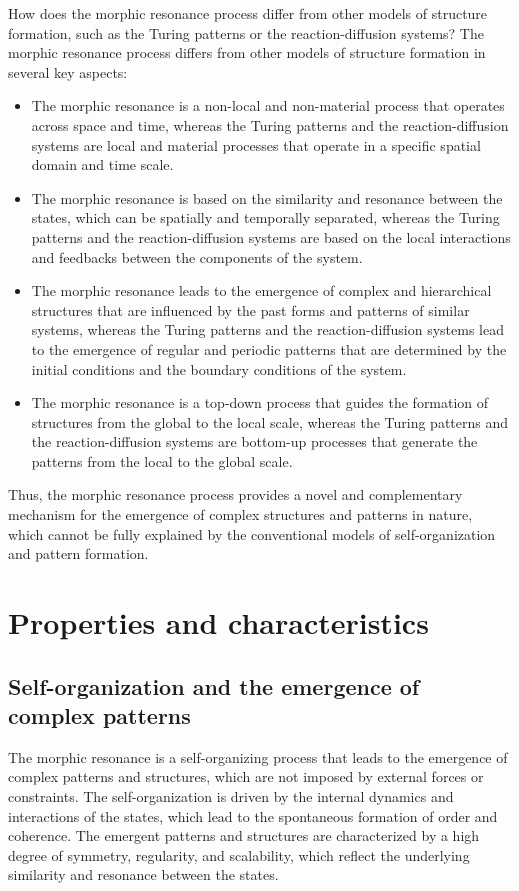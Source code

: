\begin{tcolorbox}[colback=green!5!white,colframe=green!75!black,title=Question]
    How does the morphic resonance process differ from other models of structure formation, such as the Turing patterns or the reaction-diffusion systems?
    \tcblower
    The morphic resonance process differs from other models of structure formation in several key aspects:
    \begin{itemize}
        \item The morphic resonance is a non-local and non-material process that operates across space and time, whereas the Turing patterns and the reaction-diffusion systems are local and material processes that operate in a specific spatial domain and time scale.
        \item The morphic resonance is based on the similarity and resonance between the states, which can be spatially and temporally separated, whereas the Turing patterns and the reaction-diffusion systems are based on the local interactions and feedbacks between the components of the system.
        \item The morphic resonance leads to the emergence of complex and hierarchical structures that are influenced by the past forms and patterns of similar systems, whereas the Turing patterns and the reaction-diffusion systems lead to the emergence of regular and periodic patterns that are determined by the initial conditions and the boundary conditions of the system.
        \item The morphic resonance is a top-down process that guides the formation of structures from the global to the local scale, whereas the Turing patterns and the reaction-diffusion systems are bottom-up processes that generate the patterns from the local to the global scale.
    \end{itemize}
    Thus, the morphic resonance process provides a novel and complementary mechanism for the emergence of complex structures and patterns in nature, which cannot be fully explained by the conventional models of self-organization and pattern formation.
\end{tcolorbox}

\section{Properties and characteristics}
\subsection{Self-organization and the emergence of complex patterns}
The morphic resonance is a self-organizing process that leads to the emergence of complex patterns and structures, which are not imposed by external forces or constraints. The self-organization is driven by the internal dynamics and interactions of the states, which lead to the spontaneous formation of order and coherence. The emergent patterns and structures are characterized by a high degree of symmetry, regularity, and scalability, which reflect the underlying similarity and resonance between the states.


